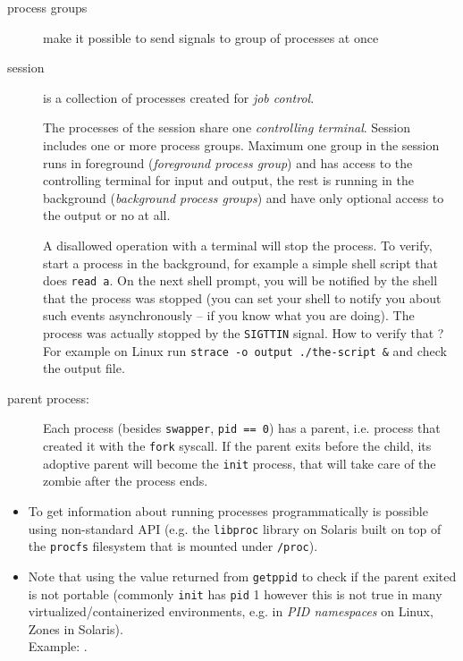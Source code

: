 \begin{description}
\item[process groups] make it possible to send signals to group of processes
at once
\item[session] is a collection of processes created for \emph{job control}.

The processes of the session share one \emph{controlling terminal}.
Session includes one or more process groups. Maximum one group in the session
runs in foreground (\emph{foreground process group}) and has access to the
controlling terminal for input and output, the rest is running in the background
(\emph{background process groups}) and have only optional access to the output
or no at all.

A disallowed operation with a terminal will stop the process.  To verify, start
a process in the background, for example a simple shell script that does
\texttt{read a}.  On the next shell prompt, you will be notified by the shell
that the process was stopped (you can set your shell to notify you about such
events asynchronously -- if you know what you are doing).  The process was
actually stopped by the \texttt{SIGTTIN} signal. How to verify that ?
For example on Linux run \texttt{strace -o output ./the-script \&}
and check the output file.

\item[parent process:] Each process (besides \texttt{swapper},
\texttt{pid~==~0})
has a parent, i.e. process that created it with the \texttt{fork} syscall.
If the parent exits before the child, its adoptive parent will become the
\texttt{init} process, that will take care of the zombie after the process ends.
\end{description}
\begin{itemize}
\item To get information about running processes programmatically is possible
using non-standard API (e.g. the \texttt{libproc} library on Solaris built
on top of the \texttt{procfs} filesystem that is mounted under \texttt{/proc}).
\item Note that using the value returned from \texttt{getppid} to check if
the parent exited is not portable (commonly \texttt{init} has
\texttt{pid} 1 however this is not true in many virtualized/containerized
environments, e.g. in \emph{PID namespaces} on Linux, Zones in Solaris).\\
Example: .
\end{itemize}


